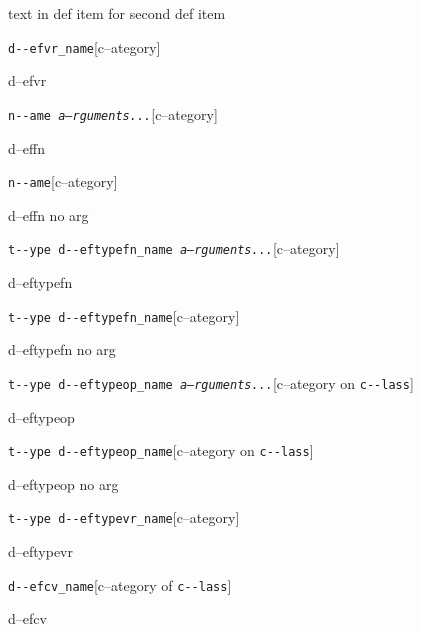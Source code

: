 \documentclass{book}
\begin{document}
%
text in def item for second def item


\noindent\texttt{d{-}{-}efvr\_name}\hfill[c--ategory]



%
d--efvr

\noindent\texttt{n{-}{-}ame \bgroup{}\normalfont{}\textsl{a--rguments...}\egroup{}}\hfill[c--ategory]



%
d--effn

\noindent\texttt{n{-}{-}ame}\hfill[c--ategory]



%
d--effn no arg

\noindent\texttt{t{-}{-}ype d{-}{-}eftypefn\_name \bgroup{}\normalfont{}\textsl{a--rguments...}\egroup{}}\hfill[c--ategory]



%
d--eftypefn

\noindent\texttt{t{-}{-}ype d{-}{-}eftypefn\_name}\hfill[c--ategory]



%
d--eftypefn no arg

\noindent\texttt{t{-}{-}ype d{-}{-}eftypeop\_name \bgroup{}\normalfont{}\textsl{a--rguments...}\egroup{}}\hfill[c--ategory on \texttt{c{-}{-}lass}]



%
d--eftypeop

\noindent\texttt{t{-}{-}ype d{-}{-}eftypeop\_name}\hfill[c--ategory on \texttt{c{-}{-}lass}]



%
d--eftypeop no arg

\noindent\texttt{t{-}{-}ype d{-}{-}eftypevr\_name}\hfill[c--ategory]



%
d--eftypevr

\noindent\texttt{d{-}{-}efcv\_name}\hfill[c--ategory of \texttt{c{-}{-}lass}]



%
d--efcv
\end{document}
